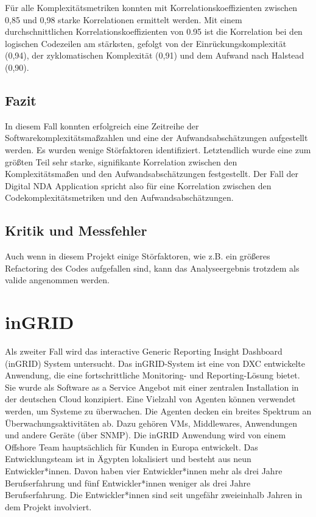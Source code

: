 Für alle Komplexitätsmetriken konnten mit Korrelationskoeffizienten
zwischen 0,85 und 0,98 starke Korrelationen ermittelt werden. Mit einem
durchschnittlichen Korrelationskoeffizienten von 0.95 ist die
Korrelation bei den logischen Codezeilen am stärksten, gefolgt von der
Einrückungskomplexität (0,94), der zyklomatischen Komplexität (0,91) und
dem Aufwand nach Halstead (0,90).

\subsection{Fazit}\label{Fazit}

In diesem Fall konnten erfolgreich eine Zeitreihe der
Softwarekomplexitätsma\ss zahlen und eine der Aufwandsabschätzungen
aufgestellt werden. Es wurden wenige Störfaktoren identifiziert.
Letztendlich wurde eine zum grö\ss ten Teil sehr starke, signifikante
Korrelation zwischen den Komplexitätsma\ss en und den Aufwandsabschätzungen
festgestellt. Der Fall der Digital \ac{NDA} Application spricht also für eine
Korrelation zwischen den Codekomplexitätsmetriken und den
Aufwandsabschätzungen.

\subsection{Kritik und Messfehler}\label{Kritik-und-Messfehler}

Auch wenn in diesem Projekt einige Störfaktoren, wie z.B. ein grö\ss eres
Refactoring des Codes aufgefallen sind, kann das Analyseergebnis
trotzdem als valide angenommen werden.

\section{inGRID}\label{ingrid}

Als zweiter Fall wird das interactive Generic Reporting Insight
Dashboard (inGRID) System untersucht. Das inGRID-System ist eine von DXC
entwickelte Anwendung, die eine fortschrittliche Monitoring- und
Reporting-Lösung bietet. Sie wurde als Software as a Service Angebot mit
einer zentralen Installation in der deutschen Cloud konzipiert. Eine
Vielzahl von Agenten können verwendet werden, um Systeme zu überwachen.
Die Agenten decken ein breites Spektrum an Überwachungsaktivitäten ab.
Dazu gehören \ac{VM}s, Middlewares, Anwendungen und andere Geräte (über
SNMP). Die inGRID Anwendung wird von einem Offshore Team hauptsächlich
für Kunden in Europa entwickelt. Das Entwicklungsteam ist in Ägypten
lokalisiert und besteht aus neun Entwickler*innen. Davon haben vier
Entwickler*innen mehr als drei Jahre Berufserfahrung und fünf
Entwickler*innen weniger als drei Jahre Berufserfahrung. Die
Entwickler*innen sind seit ungefähr zweieinhalb Jahren in dem Projekt
involviert.

